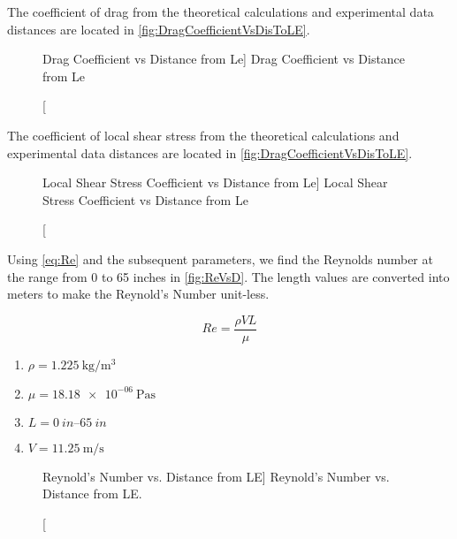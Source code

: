 \noindent The coefficient of drag from the theoretical calculations and experimental data distances are located in  \autoref{fig:DragCoefficientVsDisToLE}. 

\begin{figure}[htpb]
    \centering
     
     \caption
     [Drag Coefficient vs Distance from Le]
     {Drag Coefficient vs Distance from Le}
     \label{fig:DragCoefficientVsDisToLE}
\end{figure}

\noindent The coefficient of local shear stress from the theoretical calculations and experimental data distances are located in  \autoref{fig:DragCoefficientVsDisToLE}. 

\begin{figure}[htpb]
    \centering
     
     \caption
     [Local Shear Stress Coefficient vs Distance from Le]
     {Local Shear Stress Coefficient vs Distance from Le}
     \label{fig:LocalShearStressVsDisToLE}
\end{figure}

\noindent Using \autoref{eq:Re} and the subsequent parameters, we find the Reynolds number at the range from 0 to 65 inches in \autoref{fig:ReVsD}. The length values are converted into meters to make the Reynold's Number unit-less. 

\begin{equation}\label{eq:Re}
    Re = \frac{\rho V L}{\mu}
\end{equation}

\begin{enumerate}
    \item[] $\rho = \qty{1.225}{\kilogram\per\meter^3}$
    \item[] $\mu = \qty{18.18e-06}{\pascal\second}$
    \item[] $L = \qtyrange{0}{65}{in}$
    \item[] $V = \qty{11.25}{\meter\per\second}$
\end{enumerate}

\begin{figure}[htpb]
    \centering
     
     \caption
     [Reynold's Number vs. Distance from LE]
     {Reynold's Number vs. Distance from LE.}
     \label{fig:ReVsD}
\end{figure}